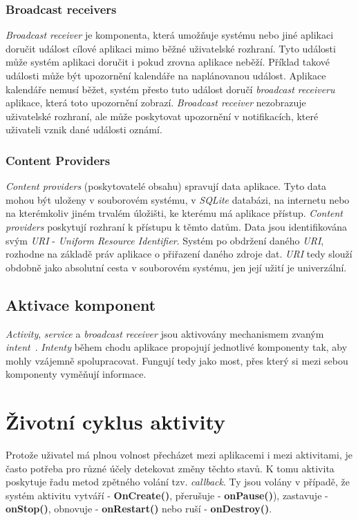         \subsubsection{Broadcast receivers}
        \emph{Broadcast receiver} je komponenta, která umožňuje systému nebo jiné aplikaci doručit událost cílové aplikaci mimo běžné uživatelské rozhraní. Tyto události může systém aplikaci doručit i pokud zrovna aplikace neběží. Příklad takové události může být upozornění kalendáře na naplánovanou událost. Aplikace kalendáře nemusí běžet, systém přesto tuto událost doručí \emph{broadcast receiveru} aplikace, která toto upozornění zobrazí. \emph{Broadcast receiver} nezobrazuje uživatelské rozhraní, ale může poskytovat upozornění v notifikacích, které uživateli vznik dané události oznámí.

        \subsubsection{Content Providers}
        \emph{Content providers} (poskytovatelé obsahu) spravují data aplikace. Tyto data mohou být uloženy v souborovém systému, v \emph{SQLite} databázi, na internetu nebo na kterémkoliv jiném trvalém úložišti, ke kterému má aplikace přístup. \emph{Content providers} poskytují rozhraní k přístupu k těmto datům. Data jsou identifikována svým \emph{URI} - \emph{Uniform Resource Identifier}. Systém po obdržení daného \emph{URI}, rozhodne na základě práv aplikace o přiřazení daného zdroje dat. \emph{URI} tedy slouží obdobně jako absolutní cesta v souborovém systému, jen její užití je univerzální.

    \subsection{Aktivace komponent}
    \emph{Activity}, \emph{service} a \emph{broadcast receiver} jsou aktivovány mechanismem zvaným \emph{intent}~. \emph{Intenty} během chodu aplikace propojují jednotlivé komponenty tak, aby mohly vzájemně spolupracovat. Fungují tedy jako most, přes který si mezi sebou komponenty vyměňují informace.

\newpage
\section{Životní cyklus aktivity}
Protože uživatel má plnou volnost přecházet mezi aplikacemi i mezi aktivitami, je často potřeba pro různé účely detekovat změny těchto stavů. K tomu aktivita poskytuje řadu metod zpětného volání tzv. \emph{callback}. Ty jsou volány v případě, že systém aktivitu vytváří - \textbf{OnCreate()}, přerušuje - \textbf{onPause()}), zastavuje - \textbf{onStop()}, obnovuje - \textbf{onRestart()} nebo ruší - \textbf{onDestroy()}.

